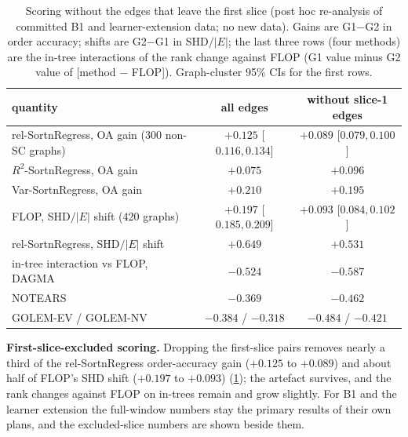 \documentclass[pdflatex,sn-apa]{sn-jnl}
\theoremstyle{thmstyleone}
\theoremstyle{thmstylethree}
\theoremstyle{thmstyletwo}
\begin{document}
\begin{table}[t]
\caption{Scoring without the edges that leave the first slice (post hoc
re-analysis of committed B1 and learner-extension data; no new data). Gains
are G1$-$G2 in order accuracy; shifts are G2$-$G1 in SHD$/|E|$; the last three
rows (four methods) are the in-tree interactions of the rank change against FLOP (G1 value
minus G2 value of [method $-$ FLOP]). Graph-cluster 95\% CIs for the first
rows.}
\label{tab:x1}
\centering\small
\setlength{\tabcolsep}{3pt}
\begin{tabular}{@{}>{\raggedright\arraybackslash}p{}cc@{}}
\toprule
quantity & all edges & without slice-1 edges \\
\midrule
rel-SortnRegress, OA gain (300 non-SC graphs) & $+0.125$ [$0.116,0.134$] & $+0.089$ [$0.079,0.100$] \\
$R^2$-SortnRegress, OA gain & $+0.075$ & $+0.096$ \\
Var-SortnRegress, OA gain & $+0.210$ & $+0.195$ \\
FLOP, SHD$/|E|$ shift (420 graphs) & $+0.197$ [$0.185,0.209$] & $+0.093$ [$0.084,0.102$] \\
rel-SortnRegress, SHD$/|E|$ shift & $+0.649$ & $+0.531$ \\
in-tree interaction vs FLOP, DAGMA & $-0.524$ & $-0.587$ \\
\quad NOTEARS & $-0.369$ & $-0.462$ \\
\quad GOLEM-EV / GOLEM-NV & $-0.384$ / $-0.318$ & $-0.484$ / $-0.421$ \\
\bottomrule
\end{tabular}
\end{table}

\textbf{First-slice-excluded scoring.} Dropping the first-slice pairs removes
nearly a third of the rel-SortnRegress order-accuracy gain ($+0.125$ to
$+0.089$) and about half of FLOP's SHD shift ($+0.197$ to $+0.093$)
(\cref{tab:x1}); the artefact survives, and the rank changes against FLOP on
in-trees remain and grow slightly. For B1 and the learner extension the
full-window numbers stay the primary results of their own plans, and the
excluded-slice numbers are shown beside them.
\end{document}
